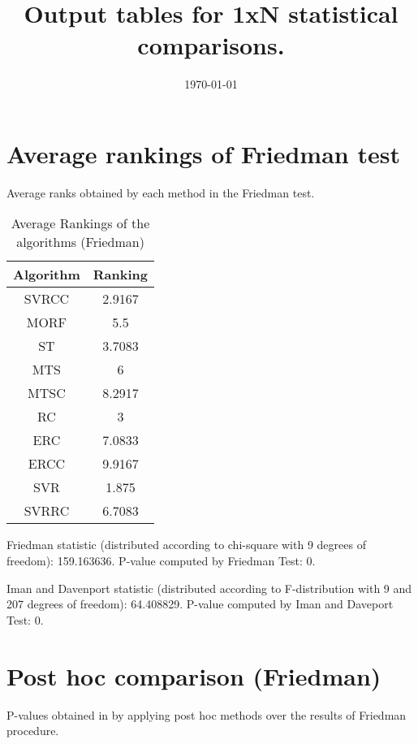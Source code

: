 \documentclass[a4paper,10pt]{article}
\title{Output tables for 1xN statistical comparisons.}
\author{}
\date{\today}
\begin{document}
\begin{landscape}
\pagestyle{empty}
\maketitle
\thispagestyle{empty}

\section{Average rankings of Friedman test}


Average ranks obtained by each method in the Friedman test.

\begin{table}[!htp]
\centering
\begin{tabular}{|c|c|}\hline
Algorithm&Ranking\\\hline
SVRCC&2.9167\\MORF&5.5\\ST&3.7083\\MTS&6\\MTSC&8.2917\\RC&3\\ERC&7.0833\\ERCC&9.9167\\SVR&1.875\\SVRRC&6.7083\\\hline\end{tabular}
\caption{Average Rankings of the algorithms (Friedman)}
\end{table}

Friedman statistic (distributed according to chi-square with 9 degrees of freedom): 159.163636. \newline P-value computed by Friedman Test: 0.\newline

Iman and Davenport statistic (distributed according to F-distribution with 9 and 207 degrees of freedom): 64.408829. \newline P-value computed by Iman and Daveport Test: 0.\newline


\newpage

\section{Post hoc comparison (Friedman)}


P-values obtained in by applying post hoc methods over the results of Friedman procedure.


\end{landscape}
\end{document}
